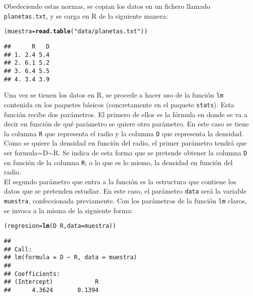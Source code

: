 \documentclass[12pt]{report}\usepackage[]{graphicx}\usepackage[dvipsnames]{xcolor}
\makeatletter
\newcommand{\hlstr}[1]{\textcolor[rgb]{0.192,0.494,0.8}{#1}}%
\newcommand{\hlopt}[1]{\textcolor[rgb]{0,0,0}{#1}}%
\newcommand{\hlstd}[1]{\textcolor[rgb]{0.345,0.345,0.345}{#1}}%
\newcommand{\hlkwb}[1]{\textcolor[rgb]{0.69,0.353,0.396}{#1}}%
\newcommand{\hlkwc}[1]{\textcolor[rgb]{0.333,0.667,0.333}{#1}}%
\newcommand{\hlkwd}[1]{\textcolor[rgb]{0.737,0.353,0.396}{\textbf{#1}}}%
\newenvironment{kframe}{%
 \def\at@end@of@kframe{}%
 \ifinner\ifhmode%
  \def\at@end@of@kframe{\end{minipage}}%
  \begin{minipage}{\columnwidth}%
 \fi\fi%
 \def\FrameCommand##1{\hskip\@totalleftmargin \hskip-\fboxsep
 \colorbox{shadecolor}{##1}\hskip-\fboxsep
     \hskip-\linewidth \hskip-\@totalleftmargin \hskip\columnwidth}%
 \MakeFramed {\advance\hsize-\width
   \@totalleftmargin\z@ \linewidth\hsize
   \@setminipage}}%
 {\par\unskip\endMakeFramed%
 \at@end@of@kframe}
\newenvironment{knitrout}{}{} %
\makeatother
\begin{document}
			Obedeciendo estas normas, se copian los datos en un fichero llamado \texttt{planetas.txt}, y se carga en R de la siguiente manera:
			
\begin{knitrout}
\color{fgcolor}\begin{kframe}
\begin{alltt}
\hlstd{(muestra} \hlkwb{=} \hlkwd{read.table}\hlstd{(}\hlstr{"data/planetas.txt"}\hlstd{))}
\end{alltt}
\begin{verbatim}
##      R   D
## 1. 2.4 5.4
## 2. 6.1 5.2
## 3. 6.4 5.5
## 4. 3.4 3.9
\end{verbatim}
\end{kframe}
\end{knitrout}
			
			Una vez se tienen los datos en R, se procede a hacer uso de la función \texttt{lm} contenida en los paquetes básicos (concretamente en el paquete \texttt{stats}). Esta función recibe dos parámetros. El primero de ellos es la fórmula en donde se va a decir en función de qué parámetro se quiere otro parámetro. En este caso se tiene la columna \texttt{R} que representa el radio y la columna \texttt{D} que representa la densidad. Como se quiere la densidad en función del radio, el primer parámetro tendrá que ser formula=D$\sim$R. Se indica de esta forma que se pretende obtener la columna \texttt{D} en función de la columna \texttt{R}; o lo que es lo mismo, la densidad en función del radio.\\ %
			
			El segundo parámetro que entra a la función es la estructura que contiene los datos que se pretenden estudiar. En este caso, el parámetro \texttt{data} será la variable \texttt{muestra}, confeccionada previamente. Con los parámetros de la función \texttt{lm} claros, se invoca a la misma de la siguiente forma:
			
\begin{knitrout}
\color{fgcolor}\begin{kframe}
\begin{alltt}
\hlstd{(regresion}\hlkwb{=}\hlkwd{lm}\hlstd{(D}\hlopt{~}\hlstd{R,} \hlkwc{data}\hlstd{=muestra))}
\end{alltt}
\begin{verbatim}
## 
## Call:
## lm(formula = D ~ R, data = muestra)
## 
## Coefficients:
## (Intercept)            R  
##      4.3624       0.1394
\end{verbatim}
\end{kframe}
\end{knitrout}
			
\end{document}
